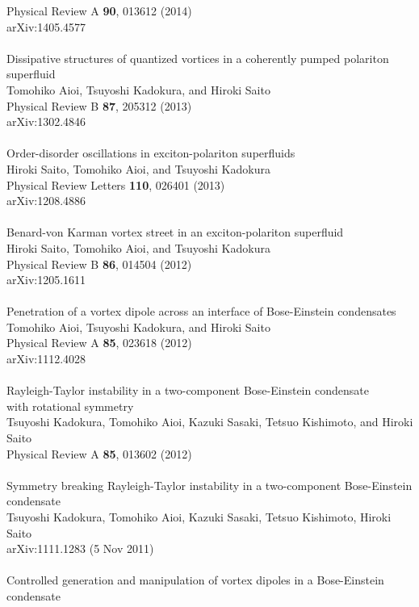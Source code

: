 \documentclass[12pt,a4paper]{jbook}
\begin{document}
Physical Review A {\bf 90}, 013612 (2014)
\\
arXiv:1405.4577
\\
\\
Dissipative structures of quantized vortices in a coherently pumped polariton superfluid
\\
Tomohiko Aioi, Tsuyoshi Kadokura, and Hiroki Saito
\\
Physical Review B {\bf 87}, 205312 (2013)
\\
arXiv:1302.4846
\\
\\
Order-disorder oscillations in exciton-polariton superfluids
\\
Hiroki Saito, Tomohiko Aioi, and Tsuyoshi Kadokura
\\
Physical Review Letters {\bf 110}, 026401 (2013)
\\
arXiv:1208.4886
\\
\\
Benard-von Karman vortex street in an exciton-polariton superfluid
\\
Hiroki Saito, Tomohiko Aioi, and Tsuyoshi Kadokura
\\
Physical Review B {\bf 86}, 014504 (2012)
\\
arXiv:1205.1611
\\
\\
Penetration of a vortex dipole across an interface of Bose-Einstein condensates
\\
Tomohiko Aioi, Tsuyoshi Kadokura, and Hiroki Saito
\\
Physical Review A {\bf 85}, 023618 (2012)
\\
arXiv:1112.4028
\\
\\
Rayleigh-Taylor instability in a two-component Bose-Einstein condensate
\\
with rotational symmetry
\\
Tsuyoshi Kadokura, Tomohiko Aioi, Kazuki Sasaki, Tetsuo Kishimoto, and Hiroki Saito
\\
Physical Review A {\bf 85}, 013602 (2012)
\\
\\
Symmetry breaking Rayleigh-Taylor instability in a two-component Bose-Einstein condensate
\\
Tsuyoshi Kadokura, Tomohiko Aioi, Kazuki Sasaki, Tetsuo Kishimoto, Hiroki Saito
\\
arXiv:1111.1283 (5 Nov 2011)
\\
\\
Controlled generation and manipulation of vortex dipoles in a Bose-Einstein condensate
\end{document}
